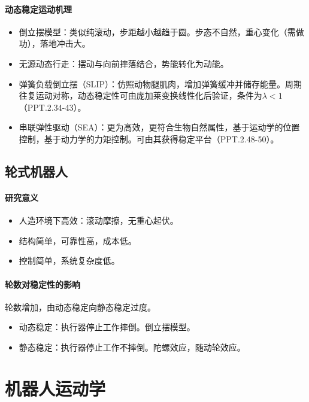 \documentclass[
12pt, %
a4paper, 
oneside, %
headinclude,footinclude, %
]{scrartcl}
\begin{document}
\paragraph{动态稳定运动机理}
\begin{itemize}
\item 倒立摆模型：类似纯滚动，步距越小越趋于圆。步态不自然，重心变化（需做功），落地冲击大。
\item 无源动态行走：摆动与向前摔落结合，势能转化为动能。
\item 弹簧负载倒立摆（SLIP）：仿照动物腿肌肉，增加弹簧缓冲并储存能量。周期往复运动对称，动态稳定性可由庞加莱变换线性化后验证，条件为$ \lambda < 1 $（PPT.2.34-43）。
\item 串联弹性驱动（SEA）：更为高效，更符合生物自然属性，基于运动学的位置控制，基于动力学的力矩控制。可由其获得稳定平台（PPT.2.48-50）。
\end{itemize}
\subsection[轮式机器人]{轮式机器人}
\paragraph{研究意义}
\begin{itemize}
\item 人造环境下高效：滚动摩擦，无重心起伏。
\item 结构简单，可靠性高，成本低。
\item 控制简单，系统复杂度低。
\end{itemize}
\paragraph{轮数对稳定性的影响}
轮数增加，由动态稳定向静态稳定过度。
\begin{itemize}
\item 动态稳定：执行器停止工作摔倒。倒立摆模型。    
\item 静态稳定：执行器停止工作不摔倒。陀螺效应，随动轮效应。
\end{itemize}
\section{机器人运动学}
\end{document}
